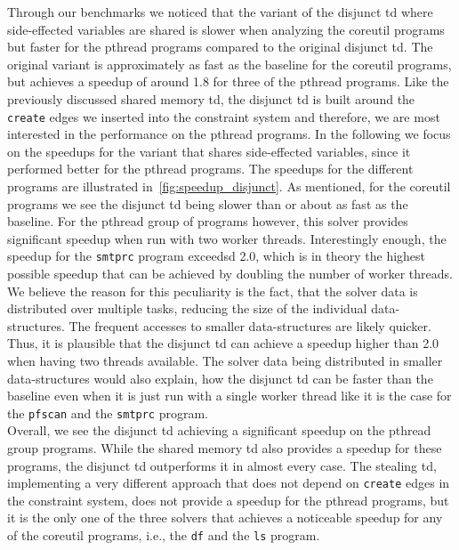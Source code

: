   Through our benchmarks we noticed that the variant of the disjunct \ac{td} where side-effected variables are shared is slower when analyzing the coreutil programs but faster for the pthread programs compared to the original disjunct \ac{td}. The original variant is approximately as fast as the baseline for the coreutil programs, but achieves a speedup of around 1.8 for three of the pthread programs.
  Like the previously discussed shared memory \ac{td}, the disjunct \ac{td} is built around the \texttt{create} edges we inserted into the constraint system and therefore, we are most interested in the performance on the pthread programs. In the following we focus on the speedups for the variant that shares side-effected variables, since it performed better for the pthread programs. The speedups for the different programs are illustrated in~\autoref{fig:speedup_disjunct}. As mentioned, for the coreutil programs we see the disjunct \ac{td} being slower than or about as fast as the baseline. For the pthread group of programs however, this solver provides significant speedup when run with two worker threads. Interestingly enough, the speedup for the \texttt{smtprc} program exceedsd 2.0, which is in theory the highest possible speedup that can be achieved by doubling the number of worker threads. We believe the reason for this peculiarity is the fact, that the solver data is distributed over multiple tasks, reducing the size of the individual data-structures. The frequent accesses to smaller data-structures are likely quicker. Thus, it is plausible that the disjunct \ac{td} can achieve a speedup higher than 2.0 when having two threads available. The solver data being distributed in smaller data-structures would also explain, how the disjunct \ac{td} can be faster than the baseline even when it is just run with a single worker thread like it is the case for the \texttt{pfscan} and the \texttt{smtprc} program.\\
  Overall, we see the disjunct \ac{td} achieving a significant speedup on the pthread group programs. While the shared memory \ac{td} also provides a speedup for these programs, the disjunct \ac{td} outperforms it in almost every case. The stealing \ac{td}, implementing a very different approach that does not depend on \texttt{create} edges in the constraint system, does not provide a speedup for the pthread programs, but it is the only one of the three solvers that achieves a noticeable speedup for any of the coreutil programs, i.e., the \texttt{df} and the \texttt{ls} program.
